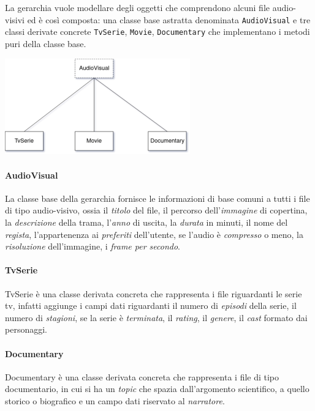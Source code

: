 La gerarchia vuole modellare degli oggetti che comprendono alcuni file audio-visivi ed è così composta: una classe base astratta denominata \texttt{AudioVisual} e tre classi derivate concrete \texttt{TvSerie}, \texttt{Movie}, \texttt{Documentary} che implementano i metodi puri della classe base. 

\begin{center}
    \includegraphics[width=0.6\textwidth]{img/gerarchia}
\end{center}

\paragraph{AudioVisual}
La classe base della gerarchia fornisce le informazioni di base comuni a tutti i file di tipo audio-visivo, ossia il \textit{titolo} del file, il percorso dell'\textit{immagine} di copertina, la \textit{descrizione} della trama, l'\textit{anno} di uscita, la \textit{durata} in minuti, il nome del \textit{regista}, l'appartenenza ai \textit{preferiti} dell'utente, se l'audio è \textit{compresso} o meno, la \textit{risoluzione} dell'immagine, i \textit{frame per secondo}.

\paragraph{TvSerie}
TvSerie è una classe derivata concreta che rappresenta i file riguardanti le serie tv, infatti aggiunge i campi dati riguardanti il numero di \textit{episodi} della serie, il numero di \textit{stagioni}, se la serie è \textit{terminata}, il \textit{rating}, il \textit{genere}, il \textit{cast} formato dai personaggi.

\paragraph{Documentary}
Documentary è una classe derivata concreta che rappresenta i file di tipo documentario, in cui si ha un \textit{topic} che spazia dall'argomento scientifico, a quello storico o biografico e un campo dati riservato al \textit{narratore}.

